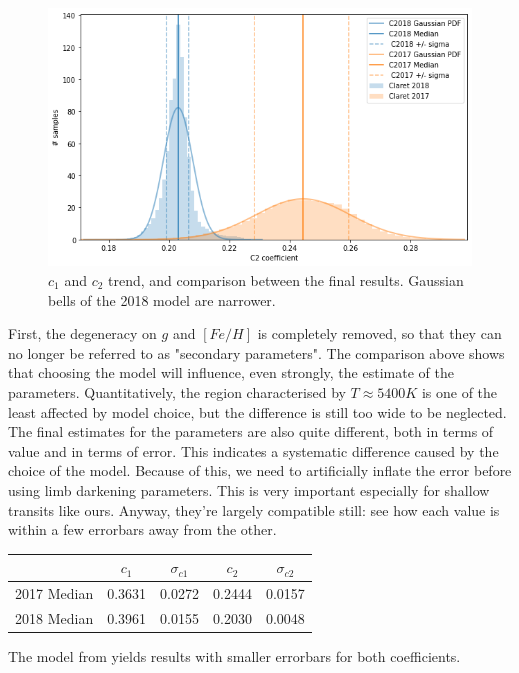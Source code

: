 \documentclass{aa}
\begin{document}
\begin{figure}[H]
    \includegraphics[scale=0.35, angle=0]{pictures/c2_comp.png}
    \caption{$c_1$ and $c_2$ trend, and comparison between the final results. Gaussian bells of the 2018 model are narrower.}
\end{figure}
First, the degeneracy on $g$ and $[Fe/H]$ is completely removed, so that they 
can no longer be referred to as "secondary parameters". The comparison above shows 
that choosing the model will influence, even strongly, the estimate of 
the parameters. Quantitatively, the region characterised by $T\approx5400 K$
is one of the least affected by model choice, but the difference is still 
too wide to be neglected.
The final estimates for the parameters are also quite different, both in 
terms of value and in terms of error. This indicates a systematic difference 
caused by the choice of the model. Because of this, we need to artificially 
inflate the error before using limb darkening parameters. This is very 
important especially for shallow transits like ours.
Anyway, they're largely compatible still: see how each value is within a 
few errorbars away from the other.
\begin{table}[h!]
	\centering
	\begin{tabular}{ccccc}
		\hline
		& $c_1$ & $\sigma_{c1}$ & $c_2$ & $\sigma_{c2}$\\
		\hline
		2017 Median & 0.3631 & 0.0272 & 0.2444 & 0.0157 \\
		2018 Median & 0.3961 & 0.0155 & 0.2030 & 0.0048 \\
		\hline
	\end{tabular} 
\end{table}
The model from \cite{claret2018} yields results with 
smaller errorbars for both coefficients.
\end{document}
